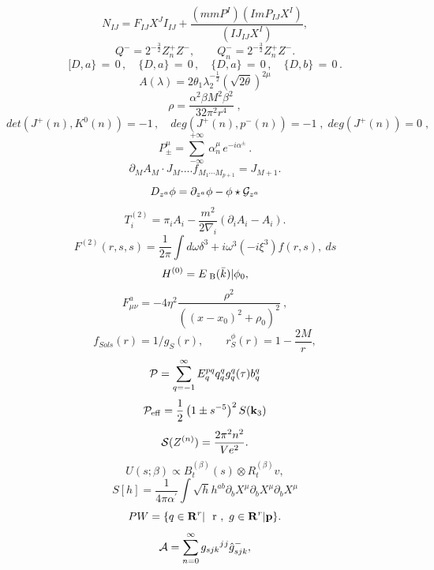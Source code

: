 \documentclass{article}
\begin{document}
$$N _ { I J } = F _ { I J } X ^ { J } I _ { I J } + \frac { ( m m P ^ { I } ) ( I m P _ { I J } X ^ { I } ) } { ( I J _ { I J } X ^ { I } ) } ,$$
$$Q ^ { - } = 2 ^ { - \frac { 3 } { 2 } } Z _ { n } ^ { + } Z ^ { - } , \qquad Q _ { n } ^ { - } = 2 ^ { - \frac { 3 } { 2 } } Z _ { n } ^ { + } Z ^ { - } .$$
$$[ D , a \} \, = \, 0 \, , \quad \{ D , a \} \, = \, 0 \, , \quad \{ D , a \} \, = \, 0 \, , \quad \{ D , b \} \, = \, 0 \, .$$
$$A ( \lambda ) = 2 \theta _ { 1 } \lambda _ { 2 } ^ { - \frac { 1 } { 2 } } \left ( \sqrt { 2 \theta } \right ) ^ { 2 \mu }$$
$$\rho = \frac { \alpha ^ { 2 } \beta M ^ { 2 } \beta ^ { 2 } } { 3 2 \pi ^ { 2 } r ^ { 4 } } \; ,$$
$$d e t ( J ^ { + } ( n ) , K ^ { 0 } ( n ) ) = - 1 \, , \quad d e g ( J ^ { + } ( n ) , p ^ { - } ( n ) ) = - 1 \; , \; d e g ( J ^ { + } ( n ) ) = 0 \; ,$$
$$P _ { \pm } ^ { \mu } = \sum _ { - \infty } ^ { + \infty } \, \alpha _ { n } ^ { \mu } \, e ^ { - i \alpha ^ { \pm } } \, .$$
$$\partial _ { M } A _ { M } \cdot J _ { M } . . . . f _ { M _ { 1 } \cdots M _ { p + 1 } } = J _ { M + 1 } .$$
$$D _ { z ^ { a } } \phi = \partial _ { z ^ { a } } \phi - \phi \star { \cal G } _ { z ^ { a } }$$
$$T _ { i } ^ { ( 2 ) } = \pi _ { i } A _ { i } - \frac { m ^ { 2 } } { 2 \nabla _ { i } } \left ( \partial _ { i } A _ { i } - A _ { i } \right ) .$$
$$F ^ { ( 2 ) } ( r , s , s ) = \frac { 1 } { 2 \pi } \int d \omega \delta ^ { 3 } + i \omega ^ { 3 } ( - i \xi ^ { 3 } ) f ( r , s ) , \ d s$$
$$H ^ { ( 0 ) } = E _ { \mathrm { \scriptsize ~ B } } ( \bar { k } ) | \phi _ { 0 } ,$$
$$F _ { \mu \nu } ^ { a } = - 4 \eta ^ { 2 } \frac { \rho ^ { 2 } } { ( ( x - x _ { 0 } ) ^ { 2 } + \rho _ { 0 } ) ^ { 2 } } \ ,$$
$$f _ { S o l s } ( r ) = 1 / g _ { S } ( r ) , \qquad r _ { S } ^ { \phi } ( r ) = 1 - \frac { 2 M } { r } ,$$
$${ \cal P } = \sum _ { q = - 1 } ^ { \infty } E _ { q } ^ { p q } q _ { q } ^ { q } g _ { q } ^ { q } ( \tau ) b _ { q } ^ { q }$$
$${ \cal P } _ { \mathrm { e f f } } = \frac { 1 } { 2 } \left ( 1 \pm s ^ { - 5 } \right ) ^ { 2 } S ( { \bf { k } } _ { 3 } )$$
$${ \cal S } ( Z ^ { ( n ) } ) = \frac { 2 \pi ^ { 2 } n ^ { 2 } } { V e ^ { 2 } } .$$
$$U ( s ; \beta ) \propto B _ { t } ^ { ( \beta ) } ( s ) \otimes R _ { t } ^ { ( \beta ) } v ,$$
$$S [ h ] = \frac { 1 } { 4 \pi \alpha ^ { \prime } } \int \sqrt { h } h ^ { a b } \partial _ { b } X ^ { \mu } \partial _ { b } X ^ { \mu } \partial _ { b } X ^ { \mu }$$
$$P W = \{ q \in { \bf R } ^ { r } | \ \mathrm { \boldmath ~ r ~ } , ~ g \in { \bf R } ^ { r } | { \bf p } \} .$$
$${ \cal A } = \sum _ { n = 0 } ^ { \infty } g _ { s j k } { } ^ { j } { } ^ { j } { \hat { g } } _ { s j k } ^ { - } ,$$
\end{document}
